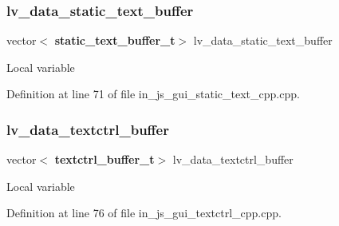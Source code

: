 \subsubsection{lv\_data\_static\_text\_buffer}
{\footnotesize\ttfamily vector$<$\textbf{ static\+\_\+text\+\_\+buffer\+\_\+t}$>$ lv\+\_\+data\+\_\+static\+\_\+text\+\_\+buffer}

Local variable 

Definition at line 71 of file in\+\_\+js\+\_\+gui\+\_\+static\+\_\+text\+\_\+cpp.\+cpp.

\mbox{\label{group___static__text_gaedebfc4d8564330649b912c46ee244a3}} 
\subsubsection{lv\_data\_textctrl\_buffer}
{\footnotesize\ttfamily vector$<$\textbf{ textctrl\+\_\+buffer\+\_\+t}$>$ lv\+\_\+data\+\_\+textctrl\+\_\+buffer}

Local variable 

Definition at line 76 of file in\+\_\+js\+\_\+gui\+\_\+textctrl\+\_\+cpp.\+cpp.

